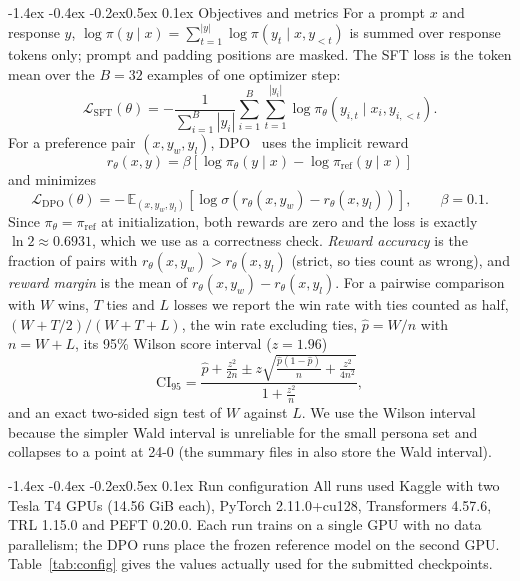 \documentclass[10pt,letterpaper]{article}
\makeatletter
\renewcommand\subsection{\@startsection{subsection}{2}{\z@}%
  {-1.4ex \@plus -0.4ex \@minus -0.2ex}{0.5ex \@plus 0.1ex}%
  {\normalfont\normalsize\bfseries}}
\makeatother
\begin{document}
\subsection{Objectives and metrics}
For a prompt $x$ and response $y$, $\log\pi(y\mid x)=\sum_{t=1}^{|y|}\log\pi(y_t\mid x,y_{<t})$ is summed over response tokens only; prompt and padding positions are masked. The SFT loss is the token mean over the $B=32$ examples of one optimizer step:
\begin{equation}
\mathcal{L}_{\mathrm{SFT}}(\theta) = -\frac{1}{\sum_{i=1}^{B}|y_i|}\sum_{i=1}^{B}\sum_{t=1}^{|y_i|}\log\pi_\theta\!\left(y_{i,t}\mid x_i,y_{i,<t}\right).
\end{equation}
For a preference pair $(x,y_w,y_l)$, DPO~\cite{rafailov2023} uses the implicit reward
\[ r_\theta(x,y)=\beta\left[\log\pi_\theta(y\mid x)-\log\pi_{\mathrm{ref}}(y\mid x)\right] \]
and minimizes
\begin{equation}
\mathcal{L}_{\mathrm{DPO}}(\theta) = -\,\mathbb{E}_{(x,y_w,y_l)}\left[\log\sigma\!\left(r_\theta(x,y_w)-r_\theta(x,y_l)\right)\right],\qquad \beta=0.1 .
\end{equation}
Since $\pi_\theta=\pi_{\mathrm{ref}}$ at initialization, both rewards are zero and the loss is exactly $\ln 2\approx0.6931$, which we use as a correctness check. \emph{Reward accuracy} is the fraction of pairs with $r_\theta(x,y_w)>r_\theta(x,y_l)$ (strict, so ties count as wrong), and \emph{reward margin} is the mean of $r_\theta(x,y_w)-r_\theta(x,y_l)$. For a pairwise comparison with $W$ wins, $T$ ties and $L$ losses we report the win rate with ties counted as half, $(W+T/2)/(W+T+L)$, the win rate excluding ties, $\hat p=W/n$ with $n=W+L$, its 95\% Wilson score interval ($z=1.96$)
\begin{equation}
\mathrm{CI}_{95}=\frac{\hat p+\frac{z^2}{2n}\pm z\sqrt{\frac{\hat p(1-\hat p)}{n}+\frac{z^2}{4n^2}}}{1+\frac{z^2}{n}} ,
\end{equation}
and an exact two-sided sign test of $W$ against $L$. We use the Wilson interval because the simpler Wald interval is unreliable for the small persona set and collapses to a point at 24-0 (the summary files in  also store the Wald interval).

\subsection{Run configuration}
All runs used Kaggle with two Tesla T4 GPUs (14.56 GiB each), PyTorch 2.11.0+cu128, Transformers 4.57.6, TRL 1.15.0 and PEFT 0.20.0. Each run trains on a single GPU with no data parallelism; the DPO runs place the frozen reference model on the second GPU. Table~\ref{tab:config} gives the values actually used for the submitted checkpoints.
\end{document}
